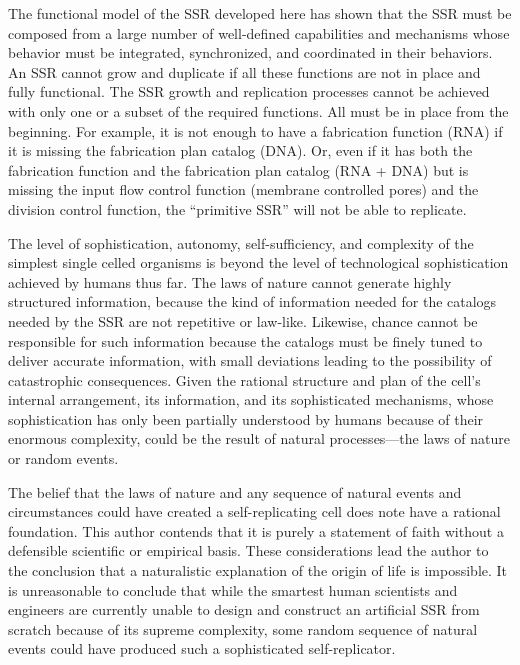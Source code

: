 The functional model of the SSR developed here has shown
that the SSR must be composed from a large number of well-defined
capabilities and mechanisms whose behavior must be integrated, synchronized, and
coordinated in their behaviors. An SSR cannot grow and duplicate if 
all these functions are not in place and fully functional. The SSR growth
and replication processes cannot be achieved with only one or a subset of the
required functions.  All must be in place from the beginning.
For example, it is not enough to have a fabrication function (RNA) if it
is missing the fabrication plan catalog (DNA). Or, even if it has both
the fabrication function and the fabrication plan catalog (RNA + DNA)
but is missing the input flow control function (membrane controlled
pores) and the division control function, the ``primitive SSR'' will not
be able to replicate.

The level of sophistication, autonomy,
self-sufficiency, and complexity of the simplest single
celled organisms is beyond the level of technological
sophistication achieved by humans thus far. 
The laws of nature cannot generate highly structured information, because
the kind of information needed for the catalogs needed by the SSR are
not repetitive or law-like.  Likewise, chance cannot be responsible for
such information because the catalogs must be finely tuned to deliver
accurate information, with small deviations leading to the possibility of
catastrophic consequences.
Given the rational structure and plan of the cell's internal
arrangement, its information, and its sophisticated
mechanisms, whose sophistication has only been partially
understood by humans because of their enormous complexity, could be the
result of natural processes---the laws of nature or random events.

The belief that the laws of
nature and any sequence of natural events and circumstances
could have created a self-replicating cell does note have a rational
foundation.  This author contends that it is purely a statement of faith without a defensible
scientific or empirical basis.
These considerations lead the author to the conclusion that a naturalistic
explanation of the origin of life is impossible.
It is unreasonable to conclude that while the smartest
human scientists and engineers are currently unable to design and
construct an artificial SSR from scratch because of its supreme
complexity, some random sequence of natural events could have produced
such a sophisticated self-replicator.

